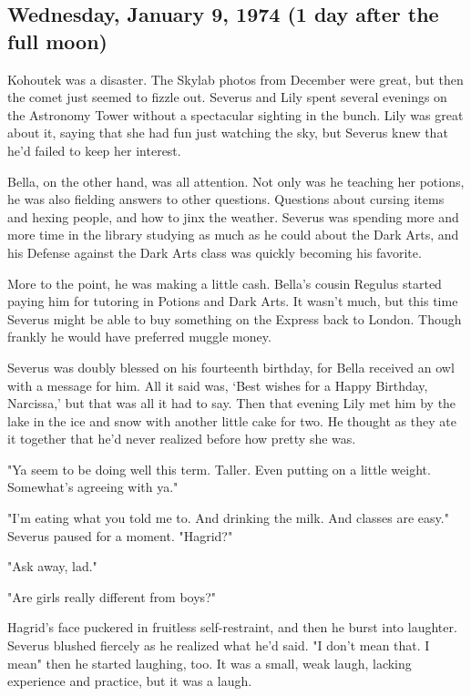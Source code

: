 \subsection{Wednesday, January 9, 1974 (1 day after the full moon)}

Kohoutek was a disaster. The Skylab photos from December were great, but then the comet just seemed to fizzle out. Severus and Lily spent several evenings on the Astronomy Tower without a spectacular sighting in the bunch. Lily was great about it, saying that she had fun just watching the sky, but Severus knew that he'd failed to keep her interest.

Bella, on the other hand, was all attention. Not only was he teaching her potions, he was also fielding answers to other questions. Questions about cursing items and hexing people, and how to jinx the weather. Severus was spending more and more time in the library studying as much as he could about the Dark Arts, and his Defense against the Dark Arts class was quickly becoming his favorite.

More to the point, he was making a little cash. Bella's cousin Regulus started paying him for tutoring in Potions and Dark Arts. It wasn't much, but this time Severus might be able to buy something on the Express back to London. Though frankly he would have preferred muggle money.

Severus was doubly blessed on his fourteenth birthday, for Bella received an owl with a message for him. All it said was, `Best wishes for a Happy Birthday, Narcissa,' but that was all it had to say. Then that evening Lily met him by the lake in the ice and snow with another little cake for two. He thought as they ate it together that he'd never realized before how pretty she was.

"Ya seem to be doing well this term. Taller. Even putting on a little weight. Somewhat's agreeing with ya."

"I'm eating what you told me to. And drinking the milk. And classes are easy." Severus paused for a moment. "Hagrid?"

"Ask away, lad."

"Are girls really different from boys?"

Hagrid's face puckered in fruitless self-restraint, and then he burst into laughter. Severus blushed fiercely as he realized what he'd said. "I don't mean that. I mean{\el}" then he started laughing, too. It was a small, weak laugh, lacking experience and practice, but it was a laugh.


